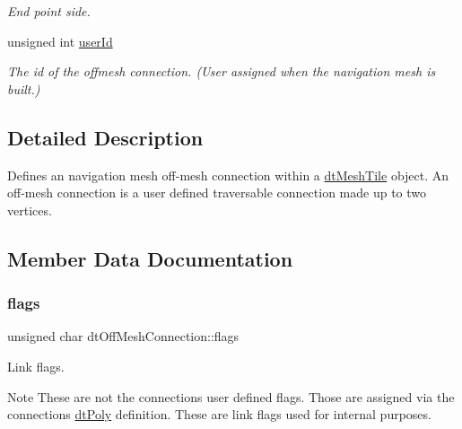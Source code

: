 \begin{DoxyCompactItemize}
\begin{DoxyCompactList}\small\item\em End point side. \end{DoxyCompactList}\item 
\mbox{\label{structdtOffMeshConnection_a157eae33ff9cb301e25f822a9d0b74dc}} 
unsigned int \hyperlink{structdtOffMeshConnection_a157eae33ff9cb301e25f822a9d0b74dc}{user\+Id}
\begin{DoxyCompactList}\small\item\em The id of the offmesh connection. (User assigned when the navigation mesh is built.) \end{DoxyCompactList}\end{DoxyCompactItemize}


\subsection{Detailed Description}
Defines an navigation mesh off-\/mesh connection within a \hyperlink{structdtMeshTile}{dt\+Mesh\+Tile} object. An off-\/mesh connection is a user defined traversable connection made up to two vertices. 

\subsection{Member Data Documentation}
\mbox{\label{structdtOffMeshConnection_adf581af16754d8bbed1479cdf91dd82d}} 
\subsubsection{\texorpdfstring{flags}{flags}}
{\footnotesize\ttfamily unsigned char dt\+Off\+Mesh\+Connection\+::flags}

Link flags. \begin{DoxyNote}{Note}
These are not the connection\textquotesingle{}s user defined flags. Those are assigned via the connection\textquotesingle{}s \hyperlink{structdtPoly}{dt\+Poly} definition. These are link flags used for internal purposes. 
\end{DoxyNote}
\mbox{\label{structdtOffMeshConnection_a1ad6f470aa15ca67e1df62d692a4efe4}} 

